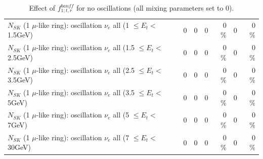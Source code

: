 \begin{table}
\begin{tabular}{| l | r | r | r  r | r  r |}
$N_{SK}$ (1 $\mu$-like ring): oscillation $\nu_{e}$ all (1 $\leq E_{t} <$ 1.5GeV) &               0 &               0 &               0 &        0 \%  &               0 &        0 \%  \\ 
$N_{SK}$ (1 $\mu$-like ring): oscillation $\nu_{e}$ all (1.5 $\leq E_{t} <$ 2.5GeV) &               0 &               0 &               0 &        0 \%  &               0 &        0 \%  \\ 
$N_{SK}$ (1 $\mu$-like ring): oscillation $\nu_{e}$ all (2.5 $\leq E_{t} <$ 3.5GeV) &               0 &               0 &               0 &        0 \%  &               0 &        0 \%  \\ 
$N_{SK}$ (1 $\mu$-like ring): oscillation $\nu_{e}$ all (3.5 $\leq E_{t} <$ 5GeV) &               0 &               0 &               0 &        0 \%  &               0 &        0 \%  \\ 
 $N_{SK}$ (1 $\mu$-like ring): oscillation $\nu_{e}$ all (5 $\leq E_{t} <$ 7GeV) &               0 &               0 &               0 &        0 \%  &               0 &        0 \%  \\ 
$N_{SK}$ (1 $\mu$-like ring): oscillation $\nu_{e}$ all (7 $\leq E_{t} <$ 30GeV) &               0 &               0 &               0 &        0 \%  &               0 &        0 \%  \\ 
\hline
\hline
\end{tabular}
\caption{ Effect of $f_{1; t, r}^{banff}$ for no oscillations (all mixing parameters set to 0). }
\label{tab:num_banff_01_1RmuT_3f_osc_t13:0}
\end{table}
\clearpage
